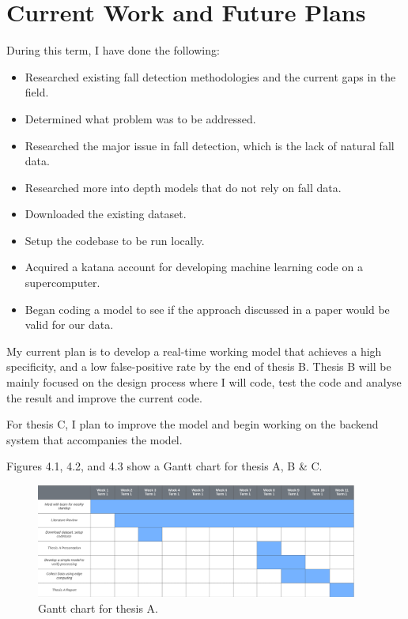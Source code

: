 \chapter{Current Work and Future Plans}\label{ch:eval}
During this term, I have done the following:
\begin{itemize}
    \item Researched existing fall detection methodologies and the current gaps in the field.
    \item Determined what problem was to be addressed.
    \item Researched the major issue in fall detection, which is the lack of natural fall data.
    \item Researched more into depth models that do not rely on fall data.
    \item Downloaded the existing dataset.
    \item Setup the codebase to be run locally.
    \item Acquired a katana account for developing machine learning code on a supercomputer.
    \item Began coding a model to see if the approach discussed in a paper would be valid for our data. 
\end{itemize}

My current plan is to develop a real-time working model that achieves a high specificity, and a low false-positive rate by the end of thesis B. Thesis B will be mainly focused on the design process where I will code, test the code and analyse the result and improve the current code. 

For thesis C, I plan to improve the model and begin working on the backend system that accompanies the model. 

Figures 4.1, 4.2, and 4.3 show a Gantt chart for thesis A, B \& C.

\begin{figure}[H]
    \centering
    \includegraphics[width=400px, keepaspectratio]{gant1.png}
    \vspace{1ex}%
    \caption{Gantt chart for thesis A.}
    \label{fig:my_label}
\end{figure}

